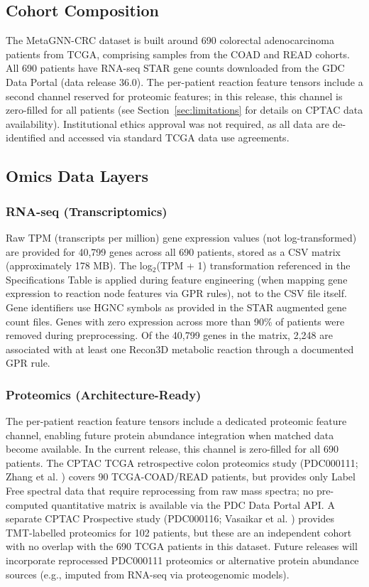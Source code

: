 \documentclass[12pt,a4paper]{article}
\begin{document}
\subsection{Cohort Composition}

The MetaGNN-CRC dataset is built around 690 colorectal adenocarcinoma patients from TCGA, comprising samples from the COAD and READ cohorts. All 690 patients have RNA-seq STAR gene counts downloaded from the GDC Data Portal (data release 36.0). The per-patient reaction feature tensors include a second channel reserved for proteomic features; in this release, this channel is zero-filled for all patients (see Section~\ref{sec:limitations} for details on CPTAC data availability). Institutional ethics approval was not required, as all data are de-identified and accessed via standard TCGA data use agreements.

\subsection{Omics Data Layers}

\subsubsection{RNA-seq (Transcriptomics)}

Raw TPM (transcripts per million) gene expression values (not log-transformed) are provided for 40,799 genes across all 690 patients, stored as a CSV matrix (approximately 178 MB). The log$_2$(TPM + 1) transformation referenced in the Specifications Table is applied during feature engineering (when mapping gene expression to reaction node features via GPR rules), not to the CSV file itself. Gene identifiers use HGNC symbols as provided in the STAR augmented gene count files. Genes with zero expression across more than 90\% of patients were removed during preprocessing. Of the 40,799 genes in the matrix, 2,248 are associated with at least one Recon3D metabolic reaction through a documented GPR rule.

\subsubsection{Proteomics (Architecture-Ready)}

The per-patient reaction feature tensors include a dedicated proteomic feature channel, enabling future protein abundance integration when matched data become available. In the current release, this channel is zero-filled for all 690 patients. The CPTAC TCGA retrospective colon proteomics study (PDC000111; Zhang et al. \cite{Zhang2014}) covers 90 TCGA-COAD/READ patients, but provides only Label Free spectral data that require reprocessing from raw mass spectra; no pre-computed quantitative matrix is available via the PDC Data Portal API. A separate CPTAC Prospective study (PDC000116; Vasaikar et al. \cite{Vasaikar2019}) provides TMT-labelled proteomics for 102 patients, but these are an independent cohort with no overlap with the 690 TCGA patients in this dataset. Future releases will incorporate reprocessed PDC000111 proteomics or alternative protein abundance sources (e.g., imputed from RNA-seq via proteogenomic models).
\end{document}
